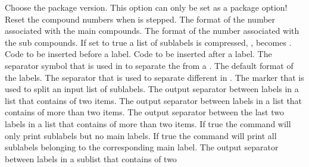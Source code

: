 \documentclass[load-preamble+,babel-options={ngerman,british,american}]{cnltx-doc}
\begin{document}
\begin{options}
    Choose the package version.  This option can only be set as a package
    option!
    Reset the compound numbers when  is stepped.
    The format of the number associated with the main compounds.
    The format of the number associated with the sub compounds.
    If set to true a list of sublabels is compressed, \ie,
     becomes
    .
  \Default
    Code to be inserted before a label.
  \Default
    Code to be inserted after a label.
    The separator symbol that is used in  to separate the  from a .
    The default format of the labels.
  \Default{,}
    The separator that is used to separate different  in
    .
  \Default{,}
    The marker that is used to split an input list of sublabels.
    The output separator between labels in a list that contains of two items.
  \Default{\visualizespaces{, }}
    The output separator between labels in a list that contains of more than
    two items.
    The output separator between the last two labels in a list that contains
    of more than two items.
    If true the command  will only print sublabels but no main
    labels.
    If true the command  will print all sublabels belonging to the
    corresponding main label.
  \Default{,}
    The output separator between labels in a sublist that contains of two

\end{options}
\end{document}
